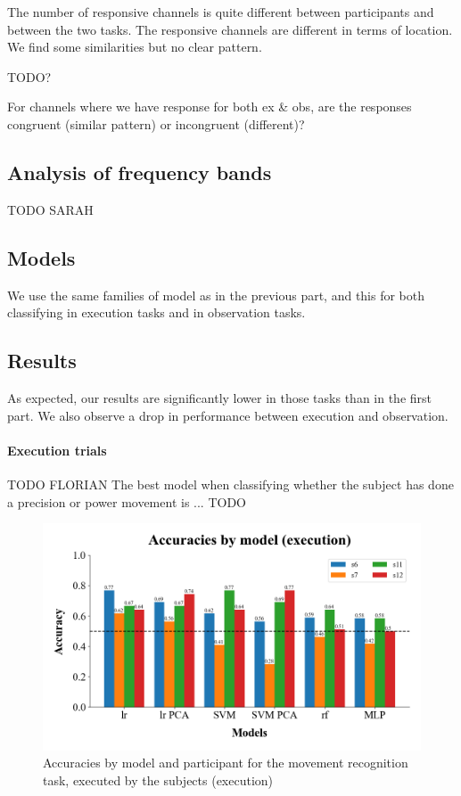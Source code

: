 \documentclass[10pt,conference,compsocconf]{IEEEtran}
\begin{document}
The number of responsive channels is quite different between participants and between the two tasks. The responsive channels are different in terms of location. We find some similarities but no clear pattern.

TODO?

For channels where we have response for both ex \& obs, are the responses congruent (similar pattern) or incongruent (different)?

\subsection{Analysis of frequency bands}
TODO SARAH

\subsection{Models}
We use the same families of model as in the previous part, and this for both classifying in execution tasks and in observation tasks.

\subsection{Results}
As expected, our results are significantly lower in those tasks than in the first part. We also observe a drop in performance between execution and observation.

\paragraph{Execution trials}
TODO FLORIAN
The best model when classifying whether the subject has done a precision or power movement is ... TODO

\begin{figure}[h!]
  \center
  \includegraphics[width=\linewidth]{../figures/accuracies_across_part_ex.png}
  \caption{Accuracies by model and participant for the movement recognition task, executed by the subjects (execution)}
\end{figure}
\FloatBarrier
\end{document}
